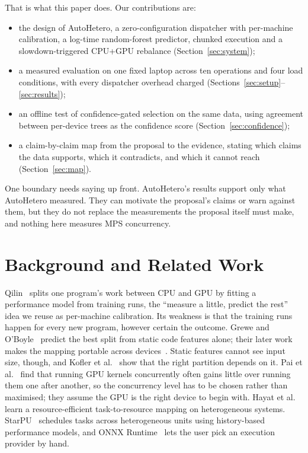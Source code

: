 \documentclass[conference]{IEEEtran}
\begin{document}
That is what this paper does. Our contributions are:
\begin{itemize}
\item the design of AutoHetero, a zero-configuration dispatcher with per-machine calibration, a log-time random-forest predictor, chunked execution and a slowdown-triggered CPU+GPU rebalance (Section~\ref{sec:system});
\item a measured evaluation on one fixed laptop across ten operations and four load conditions, with every dispatcher overhead charged (Sections~\ref{sec:setup}--\ref{sec:results});
\item an offline test of confidence-gated selection on the same data, using agreement between per-device trees as the confidence score (Section~\ref{sec:confidence});
\item a claim-by-claim map from the proposal to the evidence, stating which claims the data supports, which it contradicts, and which it cannot reach (Section~\ref{sec:map}).
\end{itemize}

One boundary needs saying up front. AutoHetero's results support only what AutoHetero measured. They can motivate the proposal's claims or warn against them, but they do not replace the measurements the proposal itself must make, and nothing here measures MPS concurrency.

\section{Background and Related Work}
\label{sec:related}

Qilin~\cite{qilin} splits one program's work between CPU and GPU by fitting a performance model from training runs, the ``measure a little, predict the rest'' idea we reuse as per-machine calibration. Its weakness is that the training runs happen for every new program, however certain the outcome. Grewe and O'Boyle~\cite{grewe11} predict the best split from static code features alone; their later work makes the mapping portable across devices~\cite{grewe13}. Static features cannot see input size, though, and Kofler et al.~\cite{kofler} show that the right partition depends on it. Pai et al.~\cite{pai} find that running GPU kernels concurrently often gains little over running them one after another, so the concurrency level has to be chosen rather than maximised; they assume the GPU is the right device to begin with. Hayat et al.~\cite{hayat} learn a resource-efficient task-to-resource mapping on heterogeneous systems. StarPU~\cite{starpu} schedules tasks across heterogeneous units using history-based performance models, and ONNX Runtime~\cite{onnxrt} lets the user pick an execution provider by hand.
\end{document}
